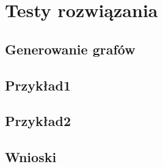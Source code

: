 \section{Testy rozwiązania}
	\label{final:testy}

	\subsection{Generowanie grafów}
		\label{final:testy:generowanie}

	\subsection{Przykład1}
		\label{final:testy:przyklad1}

	\subsection{Przykład2}
		\label{final:testy:przyklad2}

	\subsection{Wnioski}
		\label{final:testy:wnioski}

